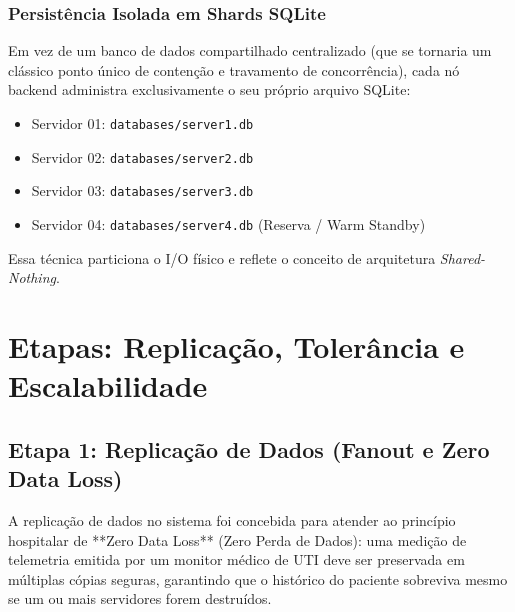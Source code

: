 \documentclass[12pt,a4paper]{article}
\begin{document}
\subsubsection{Persistência Isolada em Shards SQLite}
Em vez de um banco de dados compartilhado centralizado (que se tornaria um clássico ponto único de contenção e travamento de concorrência), cada nó backend administra exclusivamente o seu próprio arquivo SQLite:
\begin{itemize}
	\item Servidor 01: \texttt{databases/server1.db}
	\item Servidor 02: \texttt{databases/server2.db}
	\item Servidor 03: \texttt{databases/server3.db}
	\item Servidor 04: \texttt{databases/server4.db} (Reserva / Warm Standby)
\end{itemize}

Essa técnica particiona o I/O físico e reflete o conceito de arquitetura \textit{Shared-Nothing}.

\newpage

\section{Etapas: Replicação, Tolerância e Escalabilidade}
\label{sec:etapas}

\subsection{Etapa 1: Replicação de Dados (Fanout e Zero Data Loss)}
A replicação de dados no sistema foi concebida para atender ao princípio hospitalar de **Zero Data Loss** (Zero Perda de Dados): uma medição de telemetria emitida por um monitor médico de UTI deve ser preservada em múltiplas cópias seguras, garantindo que o histórico do paciente sobreviva mesmo se um ou mais servidores forem destruídos.
\end{document}
